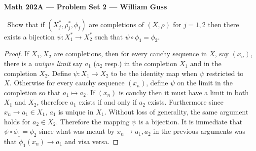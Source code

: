 \documentclass[11pt]{amsart}
\begin{document}
\begin{center}{\bf Math 202A --- Problem Set 2 --- William Guss} \end{center}


\bigskip


\medskip {}\ 
Show that
if $(X^*_j,\rho^*_j,\phi_j)$ are completions of $(X,\rho)$ for $j=1,2$
then there exists a bijection $\psi:X_1^*\to X_2^*$
such that $\psi\circ\phi_1=\phi_2$.

\begin{proof}
	If $X_1, X_2$ are completions, then for every cauchy sequence in $X$, say $(x_n)$, there is a \emph{unique limit} say $a_1$  ($a_2$ resp.) in the completion $X_1$ and in the completion $X_2$. Define $\psi:X_1 \to X_2$ to be the identity map when $\psi$ restricted to $X.$ Otherwise for every cauchy sequence $(x_n)$, define $\psi$ on the limit in the completion so that $a_1 \mapsto a_2.$ If $(x_n)$ is cauchy then it must have a limit in both $X_1$ and $X_2$, therefore $a_1$ exists if and only if $a_2$ exists. Furthermore since $x_n \to a_1 \in X_1$, $a_1$ is unique in $X_1$. Without loss of generality, the same argument holds for $a_2 \in X_2$. Therefore the mapping $\psi$ is a bijection. It is immediate that $\psi \circ \phi_1 = \phi_2$ since what was meant by $x_n \to a_1, a_2$ in the previous arguments was that $\phi_1(x_n) \to a_1$ and visa versa.
\end{proof}
\end{document}
